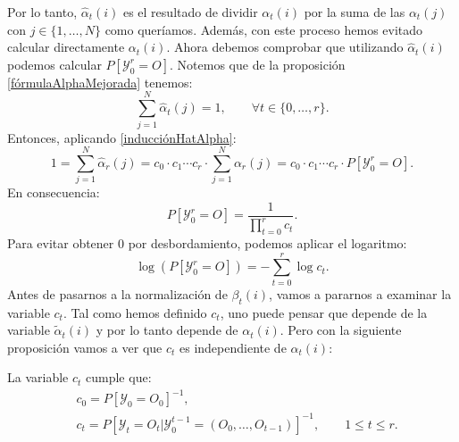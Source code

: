 Por lo tanto, $\hat{\alpha}_t(i)$ es el resultado de dividir $\alpha_t(i)$ por la suma de las $\alpha_t(j)$ con $j\in\{1,\dots,N\}$ como queríamos. Además, con este proceso hemos evitado calcular directamente $\alpha_t(i)$. Ahora debemos comprobar que utilizando $\hat{\alpha}_t(i)$ podemos calcular $P[\mathcal{Y}_0^r=O]$. Notemos que de la proposición \ref{fórmulaAlphaMejorada} tenemos:
\[\sum_{j=1}^N\hat{\alpha}_t(j)=1, \qquad \forall t\in\{0,\dots,r\}. \]
Entonces, aplicando \eqref{inducciónHatAlpha}:
\[
    1=\sum_{j=1}^N\hat{\alpha}_r(j)=c_0\cdot c_1\cdots c_r\cdot\sum_{j=1}^N\alpha_r(j) = c_0\cdot c_1\cdots c_r\cdot P[\mathcal{Y}_0^r=O].
\]
En consecuencia:
\[P[\mathcal{Y}_0^r=O]=\dfrac{1}{\displaystyle\prod_{t=0}^r c_t}.\]
Para evitar obtener $0$ por desbordamiento, podemos aplicar el logaritmo:
\[\log\left(P[\mathcal{Y}_0^r=O]\right)=-\sum_{t=0}^r\log c_t.\]
Antes de pasarnos a la normalización de $\beta_t(i)$, vamos a pararnos a examinar la variable $c_t$. Tal como hemos definido $c_t$, uno puede pensar que depende de la variable $\tilde{\alpha}_t(i)$ y por lo tanto depende de $\alpha_t(i)$. Pero con la siguiente proposición vamos a ver que $c_t$ es independiente de $\alpha_t(i)$:
\begin{proposition}
La variable $c_t$ cumple que:
\[
\begin{aligned}
    &c_0=P[\mathcal{Y}_0=O_0]^{-1}, \\
    &c_t=P[\mathcal{Y}_t=O_t|\mathcal{Y}_0^{t-1}=(O_0,\dots,O_{t-1})]^{-1}, \qquad 1\leq t\leq r.
\end{aligned}
\]
\end{proposition}
